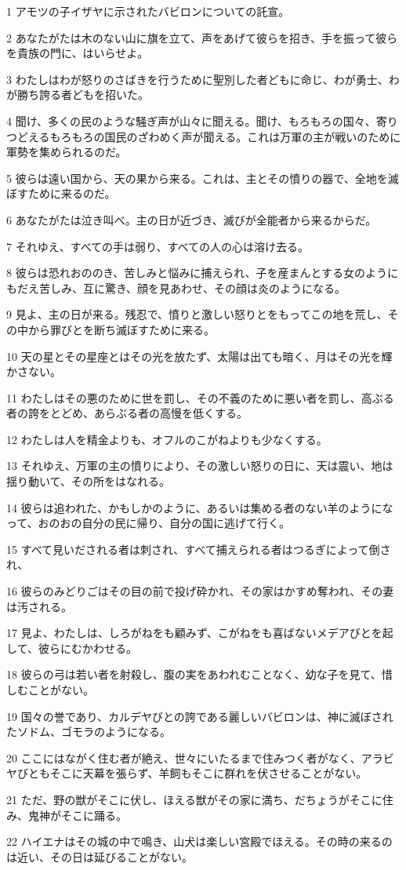 \par 1 アモツの子イザヤに示されたバビロンについての託宣。
\par 2 あなたがたは木のない山に旗を立て、声をあげて彼らを招き、手を振って彼らを貴族の門に、はいらせよ。
\par 3 わたしはわが怒りのさばきを行うために聖別した者どもに命じ、わが勇士、わが勝ち誇る者どもを招いた。
\par 4 聞け、多くの民のような騒ぎ声が山々に聞える。聞け、もろもろの国々、寄りつどえるもろもろの国民のざわめく声が聞える。これは万軍の主が戦いのために軍勢を集められるのだ。
\par 5 彼らは遠い国から、天の果から来る。これは、主とその憤りの器で、全地を滅ぼすために来るのだ。
\par 6 あなたがたは泣き叫べ。主の日が近づき、滅びが全能者から来るからだ。
\par 7 それゆえ、すべての手は弱り、すべての人の心は溶け去る。
\par 8 彼らは恐れおののき、苦しみと悩みに捕えられ、子を産まんとする女のようにもだえ苦しみ、互に驚き、顔を見あわせ、その顔は炎のようになる。
\par 9 見よ、主の日が来る。残忍で、憤りと激しい怒りとをもってこの地を荒し、その中から罪びとを断ち滅ぼすために来る。
\par 10 天の星とその星座とはその光を放たず、太陽は出ても暗く、月はその光を輝かさない。
\par 11 わたしはその悪のために世を罰し、その不義のために悪い者を罰し、高ぶる者の誇をとどめ、あらぶる者の高慢を低くする。
\par 12 わたしは人を精金よりも、オフルのこがねよりも少なくする。
\par 13 それゆえ、万軍の主の憤りにより、その激しい怒りの日に、天は震い、地は揺り動いて、その所をはなれる。
\par 14 彼らは追われた、かもしかのように、あるいは集める者のない羊のようになって、おのおの自分の民に帰り、自分の国に逃げて行く。
\par 15 すべて見いだされる者は刺され、すべて捕えられる者はつるぎによって倒され、
\par 16 彼らのみどりごはその目の前で投げ砕かれ、その家はかすめ奪われ、その妻は汚される。
\par 17 見よ、わたしは、しろがねをも顧みず、こがねをも喜ばないメデアびとを起して、彼らにむかわせる。
\par 18 彼らの弓は若い者を射殺し、腹の実をあわれむことなく、幼な子を見て、惜しむことがない。
\par 19 国々の誉であり、カルデヤびとの誇である麗しいバビロンは、神に滅ぼされたソドム、ゴモラのようになる。
\par 20 ここにはながく住む者が絶え、世々にいたるまで住みつく者がなく、アラビヤびともそこに天幕を張らず、羊飼もそこに群れを伏させることがない。
\par 21 ただ、野の獣がそこに伏し、ほえる獣がその家に満ち、だちょうがそこに住み、鬼神がそこに踊る。
\par 22 ハイエナはその城の中で鳴き、山犬は楽しい宮殿でほえる。その時の来るのは近い、その日は延びることがない。

